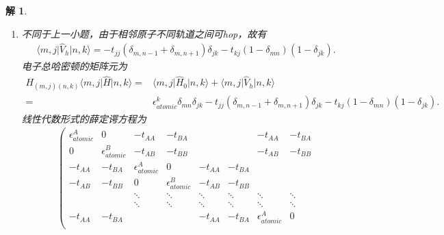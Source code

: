 \documentclass[UTF8,10pt,a4paper]{article}
\theoremstyle{Problem}
\theoremstyle{Solution}
\newtheorem*{sol}{解}
\providecommand{\abs}[1]{\left\lvert#1\right\rvert}
\begin{document}
\begin{sol}
\begin{enumerate}
\begin{itemize}
\begin{align}
        \end{align}
        或
        \begin{align}
            \epsilon_B+2\abs{t_{BB}}\geq\epsilon_A-2\abs{t_{AA}},
        \end{align}
        即
        \begin{align}
            \abs{\epsilon_A-\epsilon_B}\leq 2(\abs{t_{AA}}+\abs{t_{BB}}).
        \end{align}
        (2) 若要使系统为导体，则两个能带没有公共的能量且应当有较大的带隙，即
        \begin{align}
            \abs{\epsilon_A-\epsilon_B}\gg 2(\abs{t_{AA}}+\abs{t_{BB}}).
        \end{align}
    \end{itemize}
    \item[(b)] 不同于上一小题，由于相邻原子不同轨道之间可hop，故有
    \begin{align}
        \langle m,j\rvert\hat{V}_h\lvert n,k\rangle=-t_{jj}(\delta_{m,n-1}+\delta_{m,n+1})\delta_{jk}-t_{kj}(1-\delta_{mn})(1-\delta_{jk}).
    \end{align}
    电子总哈密顿的矩阵元为
    \begin{align}
        \nonumber H_{(m,j)(n,k)}\langle m,j\rvert\hat{H}\lvert n,k\rangle=&\langle m,j\rvert\hat{H}_0\lvert n,k\rangle+\langle m,j\rvert\hat{V}_h\lvert n,k\rangle\\
        =&\epsilon_{atomic}^k\delta_{mn}\delta_{jk}-t_{jj}(\delta_{m,n-1}+\delta_{m,n+1})\delta_{jk}-t_{kj}(1-\delta_{mn})(1-\delta_{jk}).
    \end{align}
    线性代数形式的薛定谔方程为
    \begin{align}
        \left(\begin{matrix}
            \epsilon_{atomic}^A & 0 & -t_{AA} & -t_{BA} &  &  & -t_{AA} & -t_{BA} \\
            0 & \epsilon_{atomic}^B & -t_{AB} & -t_{BB} &  &  & -t_{AB} & -t_{BB} \\
            -t_{AA} & -t_{BA} & \epsilon_{atomic}^A & 0 & -t_{AA} & -t_{BA} &  &  \\
            -t_{AB} & -t_{BB} & 0 & \epsilon_{atomic}^B & -t_{AB} & -t_{BB} &  &  \\
            &  & \ddots & \ddots & \ddots & \ddots & \ddots & \ddots \\
            &  & \ddots & \ddots & \ddots & \ddots & \ddots & \ddots \\
            -t_{AA} & -t_{BA} &  &  & -t_{AA} & -t_{BA} & \epsilon_{atomic}^A & 0 \\

\end{matrix}
\end{align}
\end{enumerate}
\end{sol}
\end{document}
